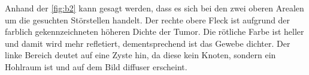 Anhand der \autoref{fig:b2} kann gesagt werden, dass es sich bei den zwei oberen Arealen um die gesuchten
Störstellen handelt. Der rechte obere Fleck ist aufgrund der farblich gekennzeichneten höheren Dichte der Tumor.
Die rötliche Farbe ist heller und damit wird mehr refletiert, dementsprechend ist das Gewebe dichter. Der linke Bereich deutet auf eine 
Zyste hin, da diese kein Knoten, sondern ein Hohlraum ist und auf dem Bild diffuser erscheint.
